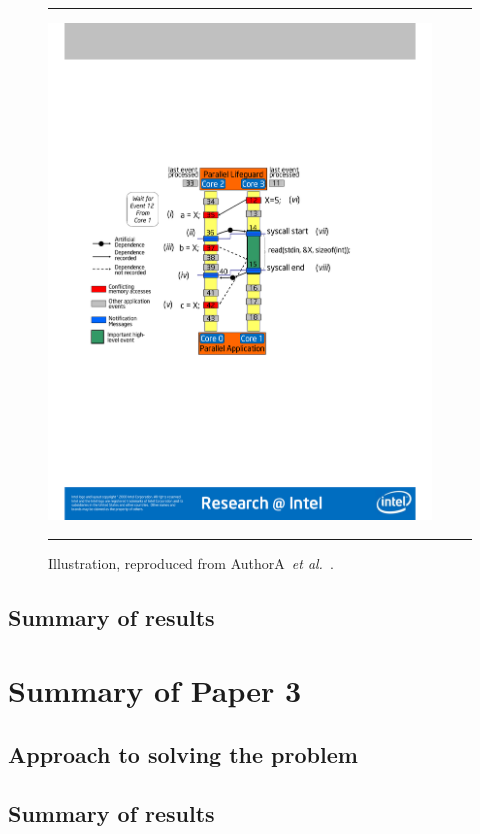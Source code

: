 \documentclass[11pt]{article}
\begin{document}
\begin{figure}[t]
\hrule
\vspace{0.1in}
\centering
\includegraphics[width=4.0in]{figures/illustration1.pdf}\\
\vspace{0.1in}
\hrule
\caption{Illustration, reproduced from AuthorA~\emph{et al.}~\cite{JournalPaperExampleTag}.}
\label{fig:results-example}
\end{figure}

\subsection{Summary of results}
\label{ref:paper2-results}



\section{Summary of Paper 3}
\label{ref:paper3-summary}

\subsection{Approach to solving the problem}
\label{ref:paper3-approach}

\subsection{Summary of results}
\label{ref:paper3-results}
\end{document}
